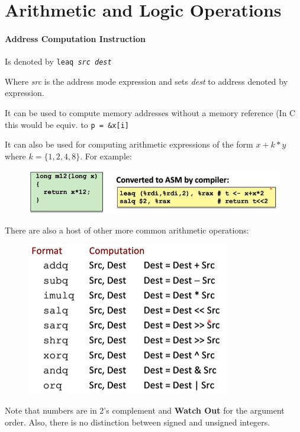 \documentclass[12pt]{book}
\begin{document}
\section*{Arithmetic and Logic Operations}
\paragraph{Address Computation Instruction}
Is denoted by \texttt{leaq\textit{ src }\textit{dest}}

Where \textit{src} is the address mode expression and sets \textit{dest} to address denoted by expression.

It can be used to compute memory addresses without a memory reference (In C this would be equiv. to \texttt{p = \&x[i]}

It can also be used for computing arithmetic expressions of the form $x + k*y$ where  $k = \{1,2,4,8\}$.
For example:
 \begin{figure}[h]
         \centering
         \includegraphics[scale = 0.7]{./figures/leaqex}
\end{figure}

There are also a host of other more common arithmetic operations:
\begin{figure}[h]
        \centering
        \includegraphics{./figures/arithops}
\end{figure}
Note that numbers are in 2's complement and \textbf{Watch Out} for the argument order. Also, there is no distinction between 
signed and unsigned integers.
\pagebreak
\end{document}
